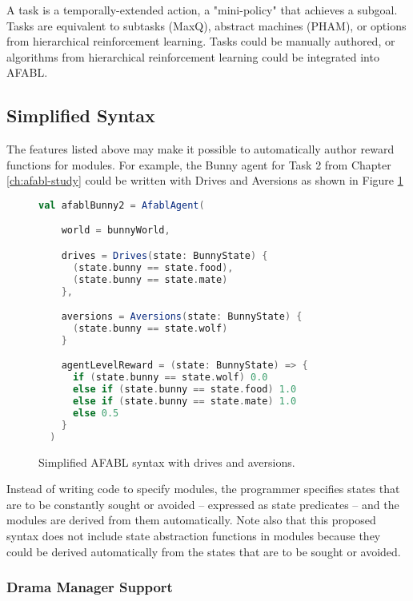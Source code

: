 A task is a temporally-extended action, a "mini-policy" that achieves a subgoal.  Tasks are equivalent to subtasks (MaxQ), abstract machines (PHAM), or options from hierarchical reinforcement learning. Tasks could be manually authored, or algorithms from hierarchical reinforcement learning could be integrated into AFABL.

\subsection{Simplified Syntax}

The features listed above may make it possible to automatically author reward functions for modules. For example, the Bunny agent for Task 2 from Chapter \ref{ch:afabl-study} could be written with Drives and Aversions as shown in Figure \ref{fig:simplified-afabl}


\begin{figure}[!h]
\begin{center}

\begin{lstlisting}[language=Scala]
  val afablBunny2 = AfablAgent(

    world = bunnyWorld,

    drives = Drives(state: BunnyState) {
      (state.bunny == state.food),
      (state.bunny == state.mate)
    },

    aversions = Aversions(state: BunnyState) {
      (state.bunny == state.wolf)
    }

    agentLevelReward = (state: BunnyState) => {
      if (state.bunny == state.wolf) 0.0
      else if (state.bunny == state.food) 1.0
      else if (state.bunny == state.mate) 1.0
      else 0.5
    }
  )
\end{lstlisting}

\caption{Simplified AFABL syntax with drives and aversions.}
\end{center}
\label{fig:simplified-afabl}
\end{figure}


Instead of writing code to specify modules, the programmer specifies states that are to be constantly sought or avoided -- expressed as state predicates -- and the modules are derived from them automatically. Note also that this proposed syntax does not include state abstraction functions in modules because they could be derived automatically from the states that are to be sought or avoided.

\subsubsection{Drama Manager Support}

